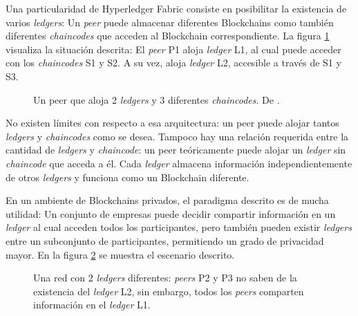 Una particularidad de Hyperledger Fabric consiste en posibilitar la existencia de varios \textit{ledgers}: Un \textit{peer} puede almacenar diferentes Blockchains como también diferentes \textit{chaincodes} que acceden al Blockchain correspondiente. La figura \ref{fig:Selection_170} visualiza la situación descrita: El \textit{peer} P1 aloja \textit{ledger} L1, al cual puede acceder con los \textit{chaincodes} S1 y S2. A su vez, aloja \textit{ledger} L2, accesible a través de S1 y S3.

\begin{figure}[H] %
    \caption{Un peer que aloja 2 \textit{ledgers} y 3 diferentes \textit{chaincodes}. De \cite{hlf-peers}.}
    \label{fig:Selection_170}
\end{figure}

No existen límites con respecto a esa arquitectura: un peer puede alojar tantos \textit{ledgers} y \textit{chaincodes} como se desea. Tampoco hay una relación requerida entre la cantidad de \textit{ledgers} y \textit{chaincode}: un peer teóricamente puede alojar un \textit{ledger} sin \textit{chaincode} que acceda a él. Cada \textit{ledger} almacena información independientemente de otros \textit{ledgers} y funciona como un Blockchain diferente.

En un ambiente de Blockchains privados, el paradigma descrito es de mucha utilidad: Un conjunto de empresas puede decidir compartir información en un \textit{ledger} al cual acceden todos los participantes, pero también pueden existir \textit{ledgers} entre un subconjunto de participantes, permitiendo un grado de privacidad mayor. En la figura \ref{fig:ledgers} se muestra el escenario descrito.

\begin{figure}[H] %
    \caption{Una red con 2 \textit{ledgers} diferentes: \textit{peers}  P2 y P3 no saben de la existencia del \textit{ledger} L2, sin embargo, todos los \textit{peers}  comparten información en el \textit{ledger} L1. }
    \label{fig:ledgers}
\end{figure}

